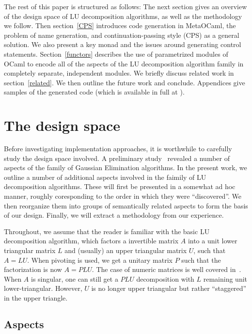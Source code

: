 \documentclass[draft]{elsart}
\begin{document}
The rest of this paper is structured as follows: The next section
gives an overview of the design space of LU decomposition algorithms,
as well as the methodology we follow.  Then section~\ref{CPS}
introduces code generation in MetaOCaml, the problem of name
generation, and continuation-passing style (CPS) as a general
solution.  We also present a key monad and the issues around generating
control statements. Section~\ref{functors} describes the use of
parametrized modules of OCaml to encode all of the aspects of the
LU decomposition algorithm family in completely separate,
independent modules.  We briefly discuss related work in
section~\ref{related}. We then outline the future work and conclude.
Appendices give samples of the generated code (which is available in
full at \cite{metamonadsURL}).

\section{The design space}\label{design}

Before investigating implementation approaches, it is worthwhile to
carefully study the design space involved.  A preliminary
study~\cite{Carette06} revealed a number of aspects of the family of
Gaussian Elimination algorithms.  In the present work, we outline a
number of additional aspects involved in the faimily of LU
decomposition algorithms.  These will first be presented in a somewhat
ad hoc manner, roughly coresponding to the order in which they were
``discovered''.  We then reorganize them into groups of
semantically related aspects to form the basis of our design.
Finally, we will extract a methodology from our experience.

Throughout, we assume that the reader is familiar with the basic LU
decomposition algorithm, which factors a invertible matrix $A$ into a unit
lower triangular matrix $L$ and (usually) an upper triangular matrix $U$,
such that $A = LU$.  When pivoting is used, we get a unitary matrix $P$ such
that the factorization is now $A = PLU$.  The case of numeric matrices is well
covered in~\cite{Golub-vanLoan}.  When $A$ is singular, one can still get
a $PLU$ decomposition with $L$ remaining unit lower-triangular. However, 
$U$ is no longer upper triangular but rather ``staggered''
in the upper triangle.

\subsection{Aspects}
\end{document}
